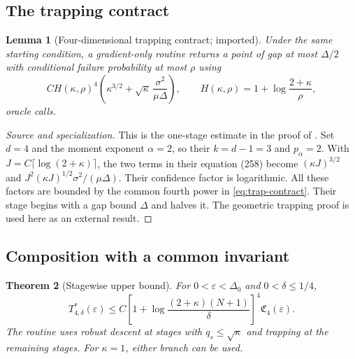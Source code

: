 \documentclass[11pt,a4paper]{article}
\newcommand{\eps}{\varepsilon}
\newcommand{\profile}{\mathfrak C_4}
\newtheorem{theorem}{Theorem}[section]
\newtheorem{lemma}[theorem]{Lemma}
\theoremstyle{definition}
\theoremstyle{remark}
\begin{document}
\subsection{The trapping contract}

\begin{lemma}[Four-dimensional trapping contract; imported]
\label{lem:trap-contract}
Under the same starting condition, a gradient-only routine returns
a point of gap at most $\Delta/2$ with conditional failure
probability at most $\rho$ using
\begin{equation}
 C H(\kappa,\rho)^4
 \left(\kappa^{3/2}
       +\sqrt\kappa\,\frac{\sigma^2}{\mu\Delta}\right),
 \qquad
 H(\kappa,\rho)=1+\log\frac{2+\kappa}{\rho},
 \label{eq:trap-contract}
\end{equation}
oracle calls.
\end{lemma}

\begin{proof}[Source and specialization]
This is the one-stage estimate in the proof of
\cite[Theorem 5.2(ii), equations (246)--(258)]{ouwang2026}.
Set $d=4$ and the moment exponent $\alpha=2$, so their
$k=d-1=3$ and $p_\alpha=2$.
With $J=C\lceil\log(2+\kappa)\rceil$, the two terms in their
equation (258) become
$(\kappa J)^{3/2}$ and $J^2(\kappa J)^{1/2}\sigma^2/(\mu\Delta)$.
Their confidence factor is logarithmic.  All these factors are
bounded by the common fourth power in \eqref{eq:trap-contract}.
Their stage begins with a gap bound $\Delta$ and halves it.
The geometric trapping proof is used here as an external result.
\end{proof}

\subsection{Composition with a common invariant}

\begin{theorem}[Stagewise upper bound]
\label{thm:upper}
For $0<\eps<\Delta_0$ and $0<\delta\le1/4$,
\begin{equation}
 T^*_{4,\delta}(\eps)
 \le C
 \left[1+\log\frac{(2+\kappa)(N+1)}{\delta}\right]^4
 \profile(\eps).
 \label{eq:main-upper}
\end{equation}
The routine uses robust descent at stages with
$q_s\le\sqrt\kappa$ and trapping at the remaining stages.
For $\kappa=1$, either branch can be used.
\end{theorem}
\end{document}
